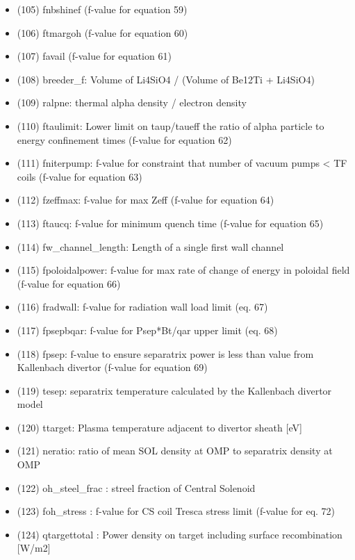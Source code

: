 \documentclass[
]{article}
\begin{document}
\begin{itemize}
\begin{itemize}
    (104) fcwr (f-value for equation 23)
  \item
    (105) fnbshinef (f-value for equation 59)
  \item
    (106) ftmargoh (f-value for equation 60)
  \item
    (107) favail (f-value for equation 61)
  \item
    (108) breeder\_f: Volume of Li4SiO4 / (Volume of Be12Ti + Li4SiO4)
  \item
    (109) ralpne: thermal alpha density / electron density
  \item
    (110) ftaulimit: Lower limit on taup/taueff the ratio of alpha
    particle to energy confinement times (f-value for equation 62)
  \item
    (111) fniterpump: f-value for constraint that number of vacuum pumps
    \textless{} TF coils (f-value for equation 63)
  \item
    (112) fzeffmax: f-value for max Zeff (f-value for equation 64)
  \item
    (113) ftaucq: f-value for minimum quench time (f-value for equation
    65)
  \item
    (114) fw\_channel\_length: Length of a single first wall channel
  \item
    (115) fpoloidalpower: f-value for max rate of change of energy in
    poloidal field (f-value for equation 66)
  \item
    (116) fradwall: f-value for radiation wall load limit (eq. 67)
  \item
    (117) fpsepbqar: f-value for Psep*Bt/qar upper limit (eq. 68)
  \item
    (118) fpsep: f-value to ensure separatrix power is less than value
    from Kallenbach divertor (f-value for equation 69)
  \item
    (119) tesep: separatrix temperature calculated by the Kallenbach
    divertor model
  \item
    (120) ttarget: Plasma temperature adjacent to divertor sheath
    {[}eV{]}
  \item
    (121) neratio: ratio of mean SOL density at OMP to separatrix
    density at OMP
  \item
    (122) oh\_steel\_frac : streel fraction of Central Solenoid
  \item
    (123) foh\_stress : f-value for CS coil Tresca stress limit (f-value
    for eq. 72)
  \item
    (124) qtargettotal : Power density on target including surface
    recombination {[}W/m2{]}

\end{itemize}
\end{itemize}
\end{document}
